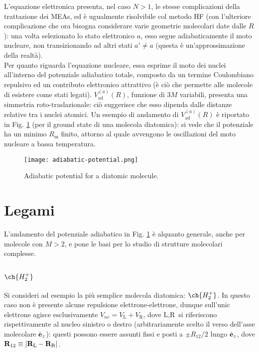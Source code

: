 L'equazione elettronica presenta, nel caso $ N > 1 $, le stesse complicazioni della trattazione dei MEAs, ed è ugualmente risolvibile col metodo HF (con l'ulteriore complicazione che ora bisogna considerare varie geometrie molecolari date dalle $ R $): una volta selezionato lo stato elettronico $ a $, esso segue adiabaticamente il moto nucleare, non transizionando ad altri stati $ a' \neq a $ (questa è un'approssimazione della realtà). \\
Per quanto riguarda l'equazione nucleare, essa esprime il moto dei nuclei all'interno del potenziale adiabatico totale, composto da un termine Coulombiano repulsivo ed un contributo elettronico attrattivo (è ciò che permette alle molecole di esistere come stati legati). $ V_\text{ad}^{(a)}(R) $, funzione di $ 3M $ variabili, presenta una simmetria roto-traslazionale: ciò suggerisce che esso dipenda dalle distanze relative tra i nuclei atomici. Un esempio di andamento di $ V_\text{ad}^{(a)}(R) $ è riportato in Fig. \ref{ad-pot} (per il ground state di una molecola diatomica): si vede che il potenziale ha un minimo $ R_\text{m} $ finito, attorno al quale avvengono le oscillazioni del moto nucleare a bassa temperatura.

\begin{figure}
	\centering
	\texttt{[image: adiabatic-potential.png]}
	\caption{Adiabatic potential for a diatomic molecule.}
	\label{ad-pot}
\end{figure}

\section{Legami}

L'andamento del potenziale adiabatico in Fig. \ref{ad-pot} è alquanto generale, anche per molecole con $ M > 2 $, e pone le basi per lo studio di strutture molecolari complesse.

\subsection{\texorpdfstring{$ \ch{H_2^+} $}{H2+}}

Si consideri ad esempio la più semplice molecola diatomica: $ \ch{H_2^+} $. In questo caso non è presente alcune repulsione elettrone-elettrone, dunque sull'unic elettrone agisce esclusivamente $ V_{ne} = V_\text{L} + V_\text{R} $, dove $ \text{L},\text{R} $ si riferiscono rispettivamente al nucleo sinistro o destro (arbitrariamente scelto il verso dell'asse molecolare $ \hat{\mathbf{e}}_z $): questi possono essere assunti fissi e posti a $ \pm R_{12}/2 $ lungo $ \hat{\mathbf{e}}_z $, dove $ \mathbf{R}_{12} \equiv \left\lvert\mathbf{R}_\text{L} - \mathbf{R}_\text{R}\right\rvert $.

